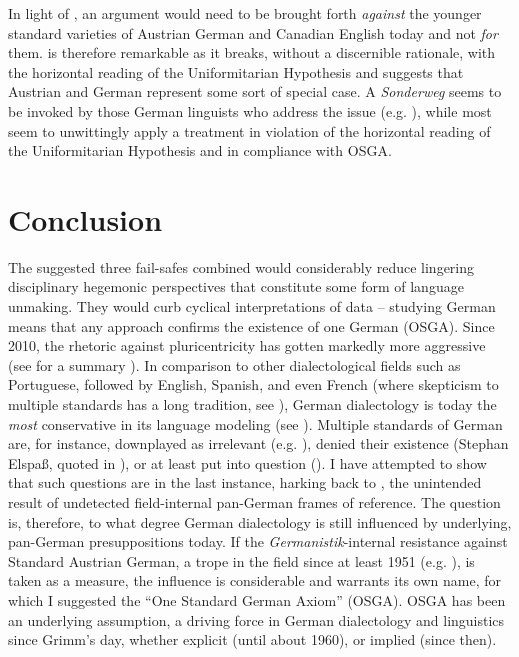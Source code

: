 \documentclass[output=paper]{langscibook}
\begin{document}
In light of , an argument would need to be brought forth \textit{against} the younger standard varieties of Austrian German and Canadian English today and not \textit{for} them.  is therefore remarkable as it breaks, without a discernible rationale, with the horizontal reading of the Uniformitarian Hypothesis and suggests that Austrian and German represent some sort of special case. A \textit{Sonderweg} seems to be invoked by those German linguists who address the issue (e.g. \citealt{Glauninger2013}), while most seem to unwittingly apply a treatment in violation of the horizontal reading of the Uniformitarian Hypothesis and in compliance with OSGA.

\section{Conclusion}\label{sec:dollinger:5}

The suggested three fail-safes combined would considerably reduce lingering disciplinary hegemonic perspectives that constitute some form of language unmaking. They would curb cyclical interpretations of data – studying German means that any approach confirms the existence of one German (OSGA). Since 2010, the rhetoric against pluricentricity has gotten markedly more aggressive (see for a summary \citealt[139--159]{Dollinger2021}). In comparison to other dialectological fields such as Portuguese, followed by English, Spanish, and even French (where skepticism to multiple standards has a long tradition, see \citealt{Oakes2001}), German dialectology is today the \textit{most} conservative in its language modeling (see \citealt{Dollinger2023a}). Multiple standards of German are, for instance, downplayed as irrelevant (e.g. \citealt[245]{BeschWolf2009}), denied their existence (Stephan Elspaß, quoted in \cites[10]{Muhr2020b}[50]{ElspaßNiehaus2014}), or at least put into question (\citealt[48,74]{KoppensteinerLenz2020}). I have attempted to show that such questions are in the last instance, harking back to \citet{Lämmert1967}, the unintended result of undetected field-internal pan-German frames of reference. The question is, therefore, to what degree German dialectology is still influenced by underlying, pan-German presuppositions today. If the \textit{Germanistik}-internal resistance against Standard Austrian German, a trope in the field since at least 1951 (e.g. \citealt[500--502]{Muhr2020a}), is taken as a measure, the influence is considerable and warrants its own name, for which I suggested the “One Standard German Axiom” (OSGA). OSGA has been an underlying assumption, a driving force in German dialectology and linguistics since Grimm’s day, whether explicit (until about 1960), or implied (since then).
\end{document}
